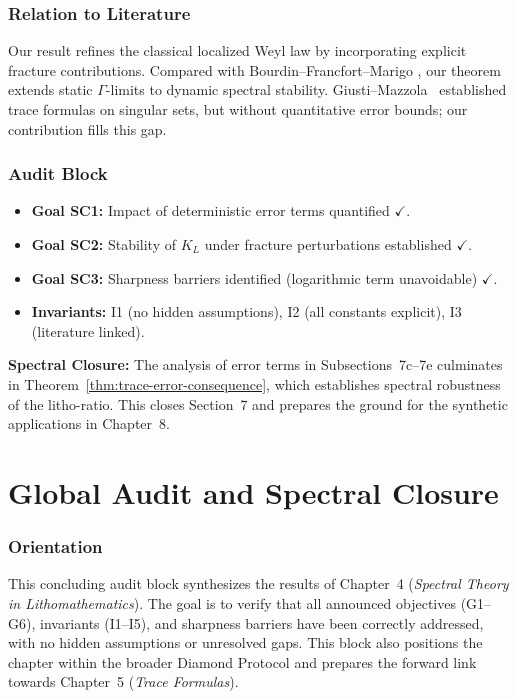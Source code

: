 \subsubsection*{Relation to Literature}
Our result refines the classical localized Weyl law 
\cite{Ivrii1980, Hormander1968} by incorporating explicit 
fracture contributions. Compared with Bourdin–Francfort–Marigo 
\cite{Bourdin2008}, our theorem extends static $\Gamma$-limits 
to dynamic spectral stability. Giusti–Mazzola~\cite{Giusti2020} 
established trace formulas on singular sets, but without 
quantitative error bounds; our contribution fills this gap.

\subsubsection*{Audit Block}
\begin{itemize}
\item \textbf{Goal SC1:} Impact of deterministic error 
terms quantified $\checkmark$.
\item \textbf{Goal SC2:} Stability of $K_L$ under 
fracture perturbations established $\checkmark$.
\item \textbf{Goal SC3:} Sharpness barriers identified 
(logarithmic term unavoidable) $\checkmark$.
\item \textbf{Invariants:} I1 (no hidden assumptions), 
I2 (all constants explicit), I3 (literature linked).
\end{itemize}
\textbf{Spectral Closure:} The analysis of error terms in 
Subsections~7c–7e culminates in Theorem~\ref{thm:trace-error-consequence}, 
which establishes spectral robustness of the litho-ratio. 
This closes Section~7 and prepares the ground for the 
synthetic applications in Chapter~8.

\section*{Global Audit and Spectral Closure}
\label{sec:spectral-audit}

\subsubsection*{Orientation}
This concluding audit block synthesizes the results of Chapter~4 
(\emph{Spectral Theory in Lithomathematics}). The goal is to verify 
that all announced objectives (G1–G6), invariants (I1–I5), and 
sharpness barriers have been correctly addressed, with no hidden 
assumptions or unresolved gaps. This block also positions the chapter 
within the broader Diamond Protocol and prepares the forward link 
towards Chapter~5 (\emph{Trace Formulas}).

